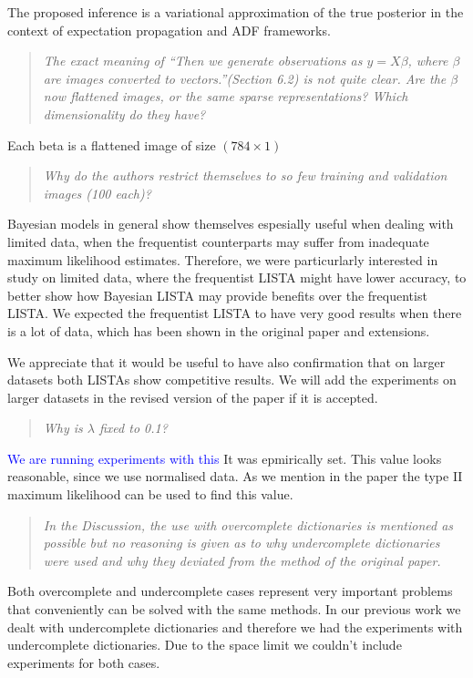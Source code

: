 \documentclass{article}
\begin{document}
The proposed inference is a variational approximation of the true posterior in the context of expectation propagation and ADF frameworks.

\begin{quote}
\textit{The exact meaning of “Then we generate observations as $y = X \beta$, where $\beta$ are images converted to vectors.”(Section 6.2) is not quite clear. Are the $\beta$ now flattened images, or the same sparse representations? Which dimensionality do they have?}
\end{quote}
Each beta is a flattened image of size $(784 \times 1)$

\begin{quote}
\textit{Why do the authors restrict themselves to so few training and validation images (100 each)?}
\end{quote}
Bayesian models in general show themselves espesially useful when dealing with limited data, when the frequentist counterparts may suffer from inadequate maximum likelihood estimates. Therefore, we were particurlarly interested in study on limited data, where the frequentist LISTA might have lower accuracy, to better show how Bayesian LISTA may provide benefits over the frequentist LISTA. We expected the frequentist LISTA to have very good results when there is a lot of data, which has been shown in the original paper and extensions.

We appreciate that it would be useful to have also confirmation that on larger datasets both LISTAs show competitive results. We will add the experiments on larger datasets in the revised version of the paper if it is accepted.

\begin{quote}
\textit{Why is $\lambda$ fixed to 0.1?}
\end{quote}
\textcolor{blue}{We are running experiments with this}
It was epmirically set. This value looks reasonable, since we use normalised data. As we mention in the paper the type II maximum likelihood can be used to find this value.

\begin{quote}
\textit{In the Discussion, the use with overcomplete dictionaries is mentioned as possible but no reasoning is given as to why undercomplete dictionaries were used and why they deviated from the method of the original paper.}
\end{quote}
Both overcomplete and undercomplete cases represent very important problems that conveniently can be solved with the same methods. In our previous work we dealt with undercomplete dictionaries and therefore we had the experiments with undercomplete dictionaries. Due to the space limit we couldn't include experiments for both cases.
\end{document}

